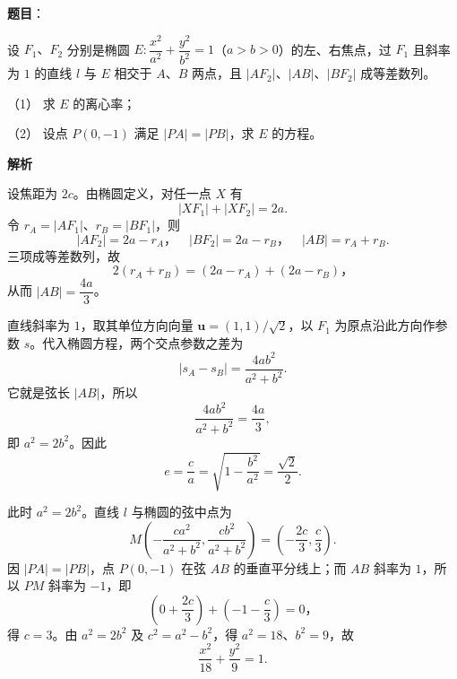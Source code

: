 \begin{answer}

\textbf{题目}：

设 $F_1\text{、}F_2$ 分别是椭圆 $E:\dfrac{x^2}{a^2}+\dfrac{y^2}{b^2}=1$（$a>b>0$）的左、右焦点，过 $F_1$ 且斜率为 $1$ 的直线 $l$ 与 $E$ 相交于 $A\text{、}B$ 两点，且 $|AF_2|\text{、}|AB|\text{、}|BF_2|$ 成等差数列。

（1） 求 $E$ 的离心率；

（2） 设点 $P(0,-1)$ 满足 $|PA|=|PB|$，求 $E$ 的方程。

\textbf{解析}


设焦距为 $2c$。由椭圆定义，对任一点 $X$ 有
\nopagebreak[4]
\[
|XF_1|+|XF_2|=2a.
\]
令 $r_A=|AF_1|\text{、}r_B=|BF_1|$，则
\nopagebreak[4]
\[
|AF_2|=2a-r_A\text{，}\quad |BF_2|=2a-r_B\text{，}\quad |AB|=r_A+r_B.
\]
三项成等差数列，故
\nopagebreak[4]
\[
2(r_A+r_B)=(2a-r_A)+(2a-r_B)\text{，}
\]
从而 $|AB|=\dfrac{4a}{3}$。

直线斜率为 $1$，取其单位方向向量 $\boldsymbol u=(1,1)/\sqrt2$，以 $F_1$ 为原点沿此方向作参数 $s$。代入椭圆方程，两个交点参数之差为
\nopagebreak[4]
\[
|s_A-s_B|=\frac{4ab^2}{a^2+b^2}.
\]
它就是弦长 $|AB|$，所以
\nopagebreak[4]
\[
\frac{4ab^2}{a^2+b^2}=\frac{4a}{3},
\]
即 $a^2=2b^2$。因此
\nopagebreak[4]
\[
e=\frac ca=\sqrt{1-\frac{b^2}{a^2}}=\frac{\sqrt2}{2}.
\]


此时 $a^2=2b^2$。直线 $l$ 与椭圆的弦中点为
\nopagebreak[4]
\[
M\left(-\frac{ca^2}{a^2+b^2},\frac{cb^2}{a^2+b^2}\right)
=\left(-\frac{2c}{3},\frac c3\right).
\]
因 $|PA|=|PB|$，点 $P(0,-1)$ 在弦 $AB$ 的垂直平分线上；而 $AB$ 斜率为 $1$，所以 $PM$ 斜率为 $-1$，即
\nopagebreak[4]
\[
\left(0+\frac{2c}{3}\right)+\left(-1-\frac c3\right)=0\text{，}
\]
得 $c=3$。由 $a^2=2b^2$ 及 $c^2=a^2-b^2$，得 $a^2=18\text{、}b^2=9$，故
\nopagebreak[4]
\[
\frac{x^2}{18}+\frac{y^2}{9}=1.
\]



\end{answer}

